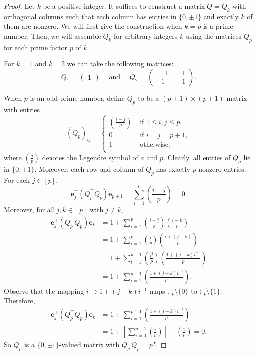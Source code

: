 \documentclass[reqno, 11pt]{amsart}
\theoremstyle{definition}
\theoremstyle{remark}
\newcommand{\FF}{\mathbb{F}}
\newcommand{\legendre}[2]{\left(\frac{#1}{#2}\right)}
\begin{document}
\begin{proof} 
		Let $k$ be a positive integer. It suffices to construct a matrix $Q=Q_k$ with orthogonal columns such that each column has entries in $\{ 0, \pm 1\}$ and exactly $k$ of them are nonzero. We will first give the construction when $k = p$ is a prime number. Then, we will assemble $Q_k$ for arbitrary integers $k$ using the matrices $Q_p$ for each prime factor $p$ of $k$.
		
 		For $k = 1$ and $k = 2$  we can take the following matrices:
			\[
				Q_ 1 = \begin{pmatrix}
						1 
						\end{pmatrix} \quad \text{ and } \quad
				Q_2 = \begin{pmatrix}
						\phantom{+}1 & \phantom{+}1\\
						-1 & \phantom{+}1
						\end{pmatrix}.
			\]
		
		When $p$ is an odd prime number, define $Q_p$ to be a $(p+1)\times (p+1)$ matrix with entries
			\[
				(Q_p)_{ij} = \begin{cases}
							\legendre{i-j}{p} & \text{ if } 1 \leq i, j \leq p, \\
							0 & \text{ if } i = j = p+1, \\
							1 & \text{ otherwise, } \\
							\end{cases}
			\]
		where $\legendre{a}{p}$ denotes the Legendre symbol of $a$ and $p$. Clearly, all entries of $Q_p$ lie in $\{ 0, \pm 1\}$. Moreover, each row and column of $Q_p$ has exactly $p$ nonzero entries. For each $j \in [p]$,
			\[
				\bm e_{j}^\intercal  (Q_p^\intercal  Q_p) \bm e_{p+1} = \sum_{i = 1}^p \legendre{i-j}{p} = 0.
			\]
		Moreover, for all  $j, k \in [p]$ with $j \neq k$,
			\begin{align*}
				\bm e_{j}^\intercal  (Q_p^\intercal  Q_p) \bm e_{k} &= 1 + \sum_{i = 1}^p \legendre{i - j}{p}\legendre{i-k}{p} \\
															&= 1  + \sum_{i = 1}^p \legendre{i}{p}\legendre{i + (j-k)}{p} \\
															&= 1  + \sum_{i = 1}^{p-1} \legendre{i^2}{p}\legendre{1 + (j-k)i^{-1}}{p}\\
															&= 1  + \sum_{i = 1}^{p-1} \legendre{1 + (j-k)i^{-1}}{p}.
			\end{align*}
		Observe that the mapping $i \mapsto 1 + (j-k)i^{-1}$ maps $\FF_p \setminus \{0\}$ to  $\FF_p \setminus \{1\}$. Therefore,
			\begin{align*}
				\bm e_{j}^\intercal  (Q_p^\intercal  Q_p) \bm e_{k} &= 1  + \sum_{i = 1}^{p-1} \legendre{1 + (j-k)i^{-1}}{p}\\
															&= 1 + \left[\sum_{i = 0}^{p-1} \legendre{i}{p}\right] - \legendre{1}{p} = 0.
			\end{align*}
		So $Q_p$ is a $\{0, \pm 1\}$-valued matrix with $Q_p^\intercal Q_p = pI$.


\end{proof}
\end{document}
